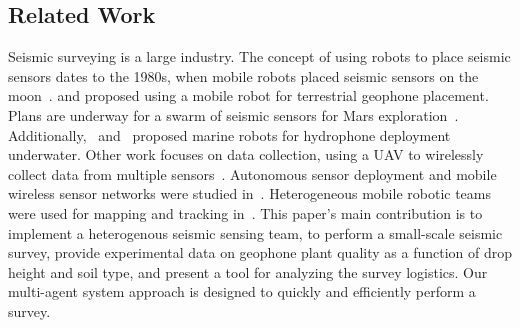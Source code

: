 \subsection{Related Work}

Seismic surveying is a large industry.
The concept of using robots to place seismic sensors dates to the 1980s, when mobile robots placed seismic sensors on the moon~\cite{LSisMSE81}. \cite{DSSMaA14} and \cite{coste2013seismic} proposed using a mobile robot for terrestrial geophone placement. Plans are underway for a swarm of seismic sensors for Mars exploration~\cite{MAPL2006}.
Additionally,~\cite{muyzert2015marine} and~\cite{postel2014drone} proposed marine robots for hydrophone deployment underwater. 
Other work  focuses on data collection, using a UAV to wirelessly collect data from multiple sensors~\cite{wilcox2013seismic}. Autonomous sensor deployment and mobile wireless sensor networks were studied in~\cite{howard2002mobile,corke2004autonomous,tuna2014autonomous}. Heterogeneous mobile robotic teams were used for mapping and tracking in~\cite{howard2006experiments}.
This paper's main contribution is to implement a heterogenous seismic sensing team, to perform a small-scale seismic survey, provide experimental data on geophone plant quality as a function of drop height and soil type, and present a tool for analyzing the survey logistics.
Our multi-agent system approach is designed to quickly and efficiently perform a survey.

